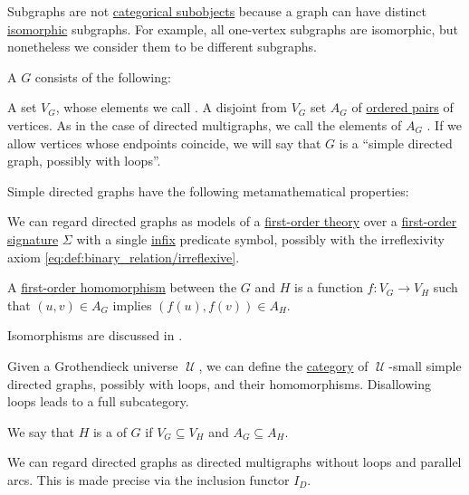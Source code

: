 \begin{remark}\label{rem:subgraphs_and_subobjects}
  Subgraphs are not \hyperref[def:subobject_and_quotient]{categorical subobjects} because a graph can have distinct \hyperref[thm:graph_isomorphism]{isomorphic} subgraphs. For example, all one-vertex subgraphs are isomorphic, but nonetheless we consider them to be different subgraphs.
\end{remark}

\begin{definition}\label{def:directed_graph}
  A  \( G \) consists of the following:
  \begin{thmenum}[series=def:directed_graph]
     A set \( V_G \), whose elements we call .
     A disjoint from \( V_G \) set \( A_G \) of \hyperref[def:cartesian_product/kuratowski_pair]{ordered pairs} of  vertices. As in the case of directed multigraphs, we call the elements of \( A_G \) . If we allow vertices whose endpoints coincide, we will say that \( G \) is a \enquote{simple directed graph, possibly with loops}.
  \end{thmenum}

  Simple directed graphs have the following metamathematical properties:
  \begin{thmenum}[resume=def:directed_graph]
    \mimprovised We can regard directed graphs as models of a \hyperref[def:first_order_theory]{first-order theory} over a \hyperref[def:first_order_signature]{first-order signature} \( \Sigma \) with a single \hyperref[rem:first_order_formula_conventions/infix]{infix} predicate symbol, possibly with the irreflexivity axiom \eqref{eq:def:binary_relation/irreflexive}.

    \mimprovised A \hyperref[def:first_order_homomorphism]{first-order homomorphism} between the \( G \) and \( H \) is a function \( f: V_G \to V_H \) such that \( (u, v) \in A_G \) implies \( (f(u), f(v)) \in A_H \).

    Isomorphisms are discussed in .

    \mimprovised Given a Grothendieck universe \( \mscrU \), we can define the \hyperref[def:category]{category} of \( \mscrU \)-small simple directed graphs, possibly with loops, and their homomorphisms. Disallowing loops leads to a full subcategory.

    \mimprovised We say that \( H \) is a  of \( G \) if \( V_G \subseteq V_H \) and \( A_G \subseteq A_H \).
  \end{thmenum}
\end{definition}
\begin{comments}
  \item We can regard directed graphs as directed multigraphs without loops and parallel arcs. This is made precise via the inclusion functor \hyperref[def:graph_functors/directed_inclusion]{\( I_D \)}.
\end{comments}

